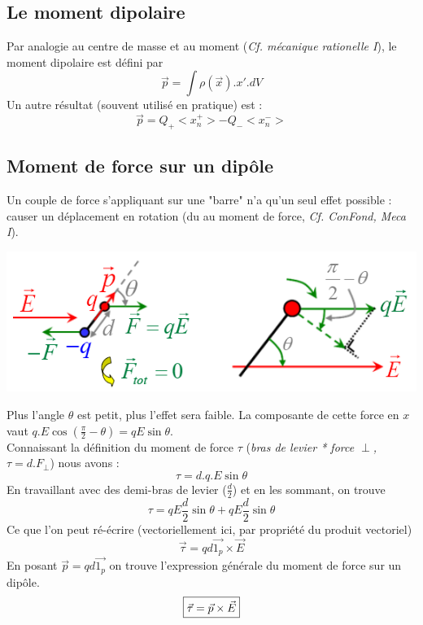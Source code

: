 \documentclass	[11pt, a4paper, openany]{book}
\begin{document}
\subsection{Le moment dipolaire}
Par analogie au centre de masse et au moment (\textit{Cf. mécanique rationelle I}), le moment dipolaire est défini par
\begin{equation}
	\vec{p} = \int \rho (\vec{x}).x'.dV
\end{equation}
Un autre résultat (souvent utilisé en pratique) est : 
\begin{equation}
	\vec{p} = Q_+ <x_n^+> - Q_-<x_n^->
\end{equation}

\newpage
\subsection{Moment de force sur un dipôle}
Un couple de force s'appliquant sur une "barre" n'a qu'un seul effet possible : causer un déplacement en rotation (du au moment de force, \textit{Cf. ConFond, Meca I}).

\begin{center}
	\includegraphics[scale=0.6]{es/image11.png}
\end{center}
Plus l'angle $\theta$ est petit, plus l'effet sera faible.  La composante de cette force en $x$ vaut $q.E\cos(\frac{\pi}{2} - \theta) = qE\sin\theta$.\\
Connaissant la définition du moment de force $\tau$ (\textit{bras de levier * force $\perp$, $\tau = d.F_\perp$}) nous avons : \\
\begin{equation}
	\tau = d.q.E\sin\theta
\end{equation}
En travaillant avec des demi-bras de levier ($\frac{d}{2}$) et en les sommant, on trouve
\begin{equation}
	\tau = qE\frac{d}{2}\sin\theta + qE\frac{d}{2}\sin\theta
\end{equation}
Ce que l'on peut ré-écrire (vectoriellement ici, par propriété du produit vectoriel)
\begin{equation}
	\vec{\tau} = qd\vec{1_p}\times \vec{E}
\end{equation}
En posant $\vec p = qd\vec{1_p}$ on trouve l'expression générale du moment de force sur un dipôle.
\begin{equation}
	\fbox{$\vec{\tau} = \vec{p} \times \vec{E}$}
\end{equation}
\end{document}
